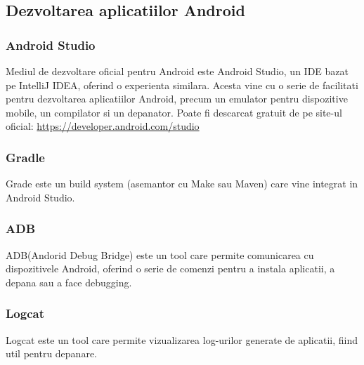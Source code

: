 \subsection{Dezvoltarea aplicatiilor Android}
\subsubsection{Android Studio}
Mediul de dezvoltare oficial pentru Android este Android Studio, un IDE bazat pe IntelliJ IDEA, oferind o experienta similara.
Acesta vine cu o serie de facilitati pentru dezvoltarea aplicatiilor Android, precum un emulator pentru dispozitive mobile, un compilator si un depanator.
Poate fi descarcat gratuit de pe site-ul oficial: \url{https://developer.android.com/studio}
\subsubsection{Gradle}
Grade este un build system (asemantor cu Make sau Maven) care vine integrat in Android Studio.
\subsubsection{ADB}
ADB(Andorid Debug Bridge) este un tool care permite comunicarea cu dispozitivele Android, oferind o serie de comenzi pentru a instala aplicatii, a depana sau a face debugging.
\subsubsection{Logcat}
Logcat este un tool care permite vizualizarea log-urilor generate de aplicatii, fiind util pentru depanare.